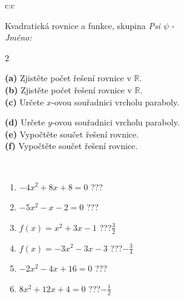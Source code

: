 \documentclass[10pt]{report}
\begin{document}
\begin{tabular}{c:c}
\begin{minipage}[c][104.5mm][t]{0.5\linewidth}
\begin{center}
\vspace{7mm}
{\huge \LARGE Kvadratická rovnice a funkce, skupina \textit{Psi $\psi$} -}\\[5mm]
\textit{Jméno:}\phantom{xxxxxxxxxxxxxxxxxxxxxxxxxxxxxxxxxxxxxxxxxxxxxxxxxxxxxxxxxxxxxxxxx}\\[5mm]
\begin{minipage}{0.95\linewidth}
\begin{center}
{\small \begin{multicols}{2} \raggedright
\textbf{(a)} Zjistěte počet řešení rovnice v \(\mathbb{R}\). \\[1mm]
\textbf{(b)} Zjistěte počet řešení rovnice v \(\mathbb{R}\). \\[1mm]
\textbf{(c)} Určete \(x\)-ovou souřadnici vrcholu paraboly. \par \columnbreak
\textbf{(d)} Určete \(y\)-ovou souřadnici vrcholu paraboly. \\[1mm]
\textbf{(e)} Vypočtěte součet řešení rovnice. \\[1mm]
\textbf{(f)} Vypočtěte součet řešení rovnice.
\end{multicols}
}
\end{center}
\end{minipage}
\\[4mm]
\begin{minipage}{0.79\linewidth}
\begin{center}
\begin{varwidth}{\linewidth}
\begin{enumerate}
\Large
\item $-4x^2+8x+8=0$\quad \dotfill\; ???\;\dotfill {}
\item $-5x^2-x-2=0$\quad \dotfill\; ???\;\dotfill {}
\item $f(x)=x^2+3x-1$\quad \dotfill\; ???\;\dotfill \quad $\frac{3}{2}$
\item $f(x)=-3x^2-3x-3$\quad \dotfill\; ???\;\dotfill \quad $-\frac{3}{4}$
\item $-2x^2-4x+16=0$\quad \dotfill\; ???\;\dotfill {}
\item $8x^2+12x+4=0$\quad \dotfill\; ???\;\dotfill \quad $-\frac{1}{2}$
\end{enumerate}
\end{varwidth}
\end{center}

\end{minipage}
\end{center}
\end{minipage}
\end{tabular}
\end{document}
